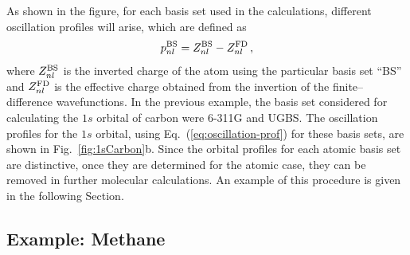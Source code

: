 \documentclass[10pt]{article}
\begin{document}
As shown in the figure, for each basis set used in the calculations,
different oscillation profiles will arise, which are defined as 
\begin{equation}
 p_{nl}^{\mbox{\scriptsize BS}} = Z_{nl}^{\mbox{\scriptsize BS}}-
 Z_{nl}^{\mbox{\scriptsize FD}} \,,
 \label{eq:oscillation-prof}
\end{equation}
where $Z_{nl}^{\mbox{\scriptsize BS}}$ is the inverted charge of the atom 
using the particular basis set ``BS'' and 
$Z_{nl}^{\mbox{\scriptsize FD}}$ is the effective charge obtained 
from the invertion of the finite--difference wavefunctions. 
In the previous example, the basis set considered for calculating 
the $1s$ orbital of carbon were \mbox{6-311G} and UGBS. The 
oscillation profiles for the $1s$ orbital, using Eq.~(\ref{eq:oscillation-prof}) 
for these basis sets, are shown in Fig.~\ref{fig:1sCarbon}b. 
Since the orbital profiles for each atomic basis set are distinctive,
once they are determined for the atomic case, they can be removed 
in further molecular calculations. An example of this procedure 
is given in the following Section.

\subsection{Example: Methane}
\label{sec:dimmethane}
\end{document}

